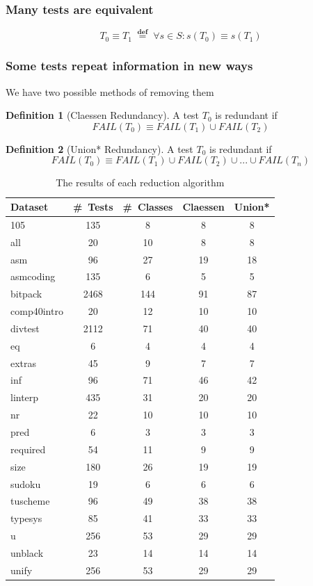 \documentclass[svgnames,14pt]{beamer}
\newcommand\fail{\mathit{FAIL}}
\newcommand\defined{\mathrel{\;\stackrel{\scriptscriptstyle\mathbf{def}}{=}\;}}
\theoremstyle{definition}
\newtheorem{defn}{Definition}
\begin{document}
\begin{frame}
\frametitle{Many tests are equivalent}
\begin{block}{}
$$ T_0 \equiv T_1 \defined \forall s \in S : s(T_0) \equiv s(T_1) $$
\end{block}
\end{frame}

\begin{frame}
\frametitle{Some tests repeat information in new ways}
We have two possible methods of removing them
\begin{defn}[Claessen Redundancy]
A test $T_0$ is redundant if
$$\fail (T_0) \equiv \fail(T_1) \cup \fail(T_2)$$
\end{defn}
\begin{defn}[Union* Redundancy]
A test $T_0$ is redundant if
$$\fail (T_0) \equiv \fail(T_1) \cup \fail(T_2) \cup ... \cup \fail(T_n) $$
\end{defn}
\end{frame}

\begin{frame}
\begin{table}[t]
\def\?{\phantom0}
\centering
\fontsize{8}{3}\selectfont
\begin{tabular}{ | l | c | c | c | c | }
\hline
Dataset & \#~Tests & \#\ Classes &  Claessen &  Union*  \\ 
\hline
105 & \?135 & \?\?8 & \?8 & \?8 \\
all & \?\?20 & \?10 & \?8 & \?8 \\
asm & \?\?96 & \?27 & 19 & 18 \\
asmcoding & \?135 & \?\?6 & \?5 & \?5 \\
bitpack & 2468 & 144 & 91 & 87 \\
comp40intro & \?\?20 & \?12 & 10 & 10 \\
divtest & 2112 & \?71 & 40 & 40 \\
eq & \?\?\?6 & \?\?4 & \?4 & \?4 \\
extras & \?\?45 & \?\?9 & \?7 & \?7 \\
inf & \?\?96 & \?71 & 46 & 42 \\
linterp & \?435 & \?31 & 20 & 20 \\
nr & \?\?22 & \?10 & 10 & 10 \\
pred & \?\?\?6 & \?\?3 & \?3 & \?3 \\
required & \?\?54 & \?11 & \?9 & \?9 \\
size & \?180 & \?26 & 19 & 19 \\
sudoku & \?19 & \?\?6 & \?6 & \?6 \\
tuscheme & \?\?96 & \?49 & 38 & 38 \\
typesys & \?\?85 & \?41 & 33 & 33 \\
u & \?256 & \?53 & 29 & 29 \\
unblack & \?23 & \?14 & 14 & 14 \\
unify & \?256 & \?53 & 29 & 29 \\
\hline
\end{tabular}
\caption{The results of each reduction algorithm}
\end{table}
\end{frame}
\end{document}

